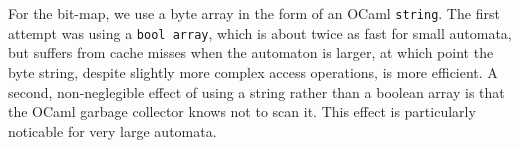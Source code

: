 For the bit-map, we use a byte array in the form of an OCaml \texttt{string}.
The first attempt was using a \texttt{bool array}, which is about twice as fast
for small automata, but suffers from cache misses when the automaton is larger,
at which point the byte string, despite slightly more complex access operations,
is more efficient. A second, non-neglegible effect of using a string rather than
a boolean array is that the OCaml garbage collector knows not to scan it. This
effect is particularly noticable for very large automata.


